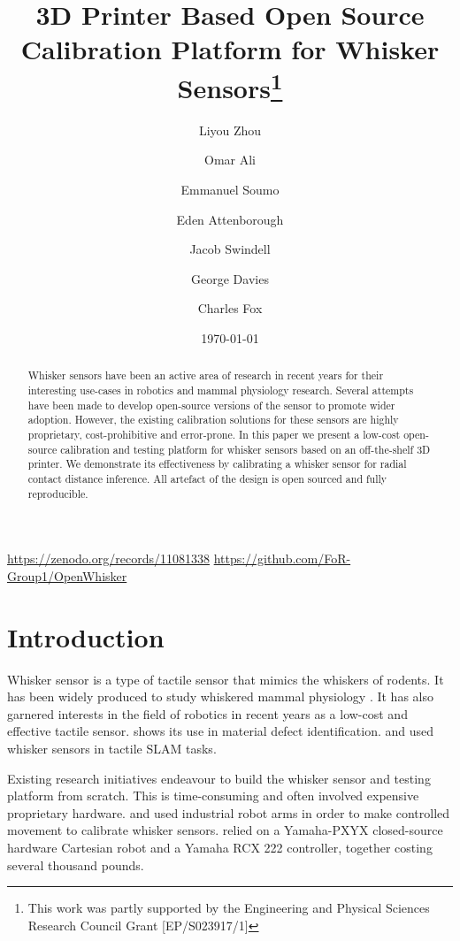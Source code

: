 \documentclass[runningheads]{llncs}
\title{3D Printer Based Open Source Calibration Platform for Whisker Sensors\thanks{This work was partly supported by the Engineering and Physical Sciences
Research Council Grant [EP/S023917/1]}}
\author{
    Liyou Zhou\orcidID{0009-0005-9491-9003} \and
    Omar Ali \orcidID{0009-0009-3523-6084} \and
    Emmanuel Soumo \and
    Eden Attenborough \and
    Jacob Swindell \and
    George Davies \and
    Charles Fox
}
\institute{School of Computer Science, University of Lincoln, Lincoln, UK}
\date{\today}
\begin{document}
\maketitle

\vspace{-10pt}

\begin{center}
    \url{https://zenodo.org/records/11081338}
    \url{https://github.com/FoR-Group1/OpenWhisker}
\end{center}

\begin{abstract}
Whisker sensors have been an active area of research in recent years for their interesting use-cases in robotics and mammal physiology research. Several attempts have been made to develop open-source versions of the sensor to promote wider adoption. However, the existing calibration solutions for these sensors are highly proprietary, cost-prohibitive and error-prone. In this paper we present a low-cost open-source calibration and testing platform for whisker sensors based on an off-the-shelf 3D printer. We demonstrate its effectiveness by calibrating a whisker sensor for radial contact distance inference. All artefact of the design is open sourced and fully reproducible.
\end{abstract}

\section{Introduction}

Whisker sensor is a type of tactile sensor that mimics the whiskers of rodents. It has been widely produced to study whiskered mammal physiology \cite{prescottActiveTouchSensing2020}. It has also garnered interests in the field of robotics in recent years as a low-cost and effective tactile sensor. \cite{fotouhiDetectionBarelyVisible2021} shows its use in material defect identification. \cite{struckmeierViTaSLAMBioinspiredVisuoTactile2019} and \cite{foxTactileSLAMBiomimetic2012} used whisker sensors in tactile SLAM tasks.

Existing research initiatives endeavour to build the whisker sensor and testing platform from scratch. This is time-consuming and often involved expensive proprietary hardware. \cite{sullivanTactileDiscriminationUsing2012} and \cite{fotouhiDetectionBarelyVisible2021} used industrial robot arms in order to make controlled movement to calibrate whisker sensors. \cite{evansWhiskerobjectContactSpeed2010} relied on a Yamaha-PXYX closed-source hardware Cartesian robot and a Yamaha RCX 222 controller, together costing several thousand pounds.
\end{document}
